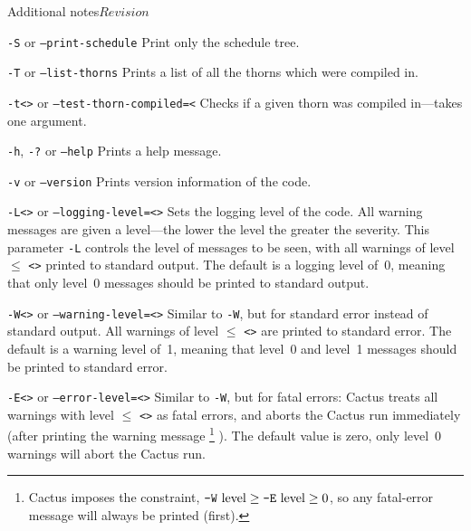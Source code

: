 \begin{cactuspart}{Additional notes}{}{$Revision$}
\begin{Lentry}
\item [\texttt{-S} or \texttt{--print-schedule}]
Print only the schedule tree.

\item [\texttt{-T} or \texttt{--list-thorns}]
Prints a list of all the thorns which were compiled in.

\item [\texttt{-t<\var{arrangement or thorn}>} or \texttt{--test-thorn-compiled=<\var{arrangement or thorn>}} ]
Checks if a given thorn was compiled in---takes one argument.

\item [\texttt{-h}, \texttt{-?} or \texttt{--help}]
Prints a help message.

\item [\texttt{-v} or \texttt{--version}]
Prints version information of the code.


\item [\texttt{-L<\var{level}>} or \texttt{--logging-level=<\var{level}>}]
Sets the logging level of the code.  All warning messages are given a
level---the lower the level the greater the severity.  This
parameter \texttt{-L} controls the level of messages to be seen, with all
warnings of level $\le$ \texttt{<>} printed to standard output.  The
default is a logging level of~0, meaning that only level~0 messages
should be printed to standard output.

\item [\texttt{-W<\var{level}>} or \texttt{--warning-level=<\var{level}>}]
Similar to \texttt{-W}, but for standard error instead of
standard output.  All warnings of level $\le$ \texttt{<>} are
printed to standard error.  The default is a warning level of~1,
meaning that level~0 and level~1 messages should be printed to
standard error.

\item [\texttt{-E<\var{level}>} or \texttt{--error-level=<\var{level}>}]
Similar to \texttt{-W}, but for fatal errors: Cactus treats all
warnings with level $\le$ \texttt{<>} as fatal errors, and aborts
the Cactus run immediately (after printing the warning message%
\footnote{%
         Cactus imposes the constraint,
         $\mbox{\texttt{-W} level} \ge \mbox{\texttt{-E} level} \ge 0$,
         so any fatal-error message will always be printed (first).
         }%
).  The default value is zero, \ie{} only level~0 warnings
will abort the Cactus run.


\end{Lentry}
\end{cactuspart}
